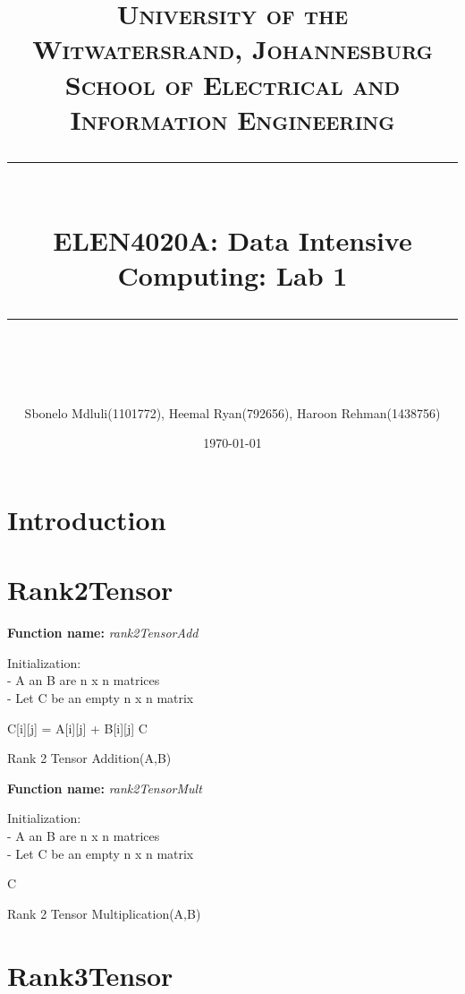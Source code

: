 \documentclass[11pt]{article} %
\title{	
	\normalfont\largesize
	\textbf{\textsc{University of the Witwatersrand, Johannesburg}}\\ %
	\textsc{School of Electrical and Information Engineering}\\ %
	\vspace{5pt} %
	\rule{\linewidth}{0.5pt}\\ %
	\vspace{10pt} %
	{\huge ELEN4020A: Data Intensive Computing: Lab 1}\\ %
	\vspace{1pt} %
	\rule{\linewidth}{2pt}\\ %
	\vspace{1pt} %
}
\author{ Sbonelo Mdluli(1101772), Heemal Ryan(792656), Haroon Rehman(1438756) } %
\date{\normalsize\today} %
\begin{document}
\maketitle 

\section{Introduction}

\section{Rank2Tensor}

\begin{algorithm}[H]
\SetAlgoLined
\textbf{Function name:} \emph{rank2TensorAdd}

Initialization\::\\ 
- A an B are n x n matrices\\
- Let C be an empty n x n matrix

    {
        {C[i][j] = A[i][j] + B[i][j]}}
 \Return C
 
\caption{Rank 2 Tensor Addition(A,B)}
\end{algorithm}
\bigbreak
\begin{algorithm}[H]
\SetAlgoLined
\textbf{Function name:} \emph{rank2TensorMult}

 Initialization\::\\ 
 - A an B are n x n matrices\\
 - Let C be an empty n x n matrix
 
  {
 }
 
 \Return C
 
\caption{Rank 2 Tensor Multiplication(A,B)}
\end{algorithm}
\section{Rank3Tensor}

\end{document}
